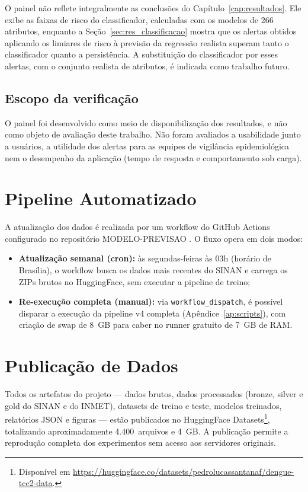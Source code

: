 O painel não reflete integralmente as conclusões do Capítulo~\ref{cap:resultados}. Ele exibe as faixas de risco do classificador, calculadas com os modelos de 266 atributos, enquanto a Seção~\ref{sec:res_classificacao} mostra que os alertas obtidos aplicando os limiares de risco à previsão da regressão realista superam tanto o classificador quanto a persistência. A substituição do classificador por esses alertas, com o conjunto realista de atributos, é indicada como trabalho futuro.

\subsection{Escopo da verificação}

O painel foi desenvolvido como meio de disponibilização dos resultados, e não como objeto de avaliação deste trabalho. Não foram avaliados a usabilidade junto a usuários, a utilidade dos alertas para as equipes de vigilância epidemiológica nem o desempenho da aplicação (tempo de resposta e comportamento sob carga).

\section{Pipeline Automatizado}

A atualização dos dados é realizada por um workflow do GitHub Actions configurado no repositório MODELO-PREVISAO \cite{modeloprevisao2026}. O fluxo opera em dois modos:

\begin{itemize}
    \item \textbf{Atualização semanal (cron):} às segundas-feiras às 03h (horário de Brasília), o workflow busca os dados mais recentes do SINAN e carrega os ZIPs brutos no HuggingFace, sem executar a pipeline de treino;
    \item \textbf{Re-execução completa (manual):} via \texttt{workflow\_dispatch}, é possível disparar a execução da pipeline v4 completa (Apêndice~\ref{ap:scripts}), com criação de swap de 8~GB para caber no runner gratuito de 7~GB de RAM.
\end{itemize}

\section{Publicação de Dados}

Todos os artefatos do projeto --- dados brutos, dados processados (bronze, silver e gold do SINAN e do INMET), datasets de treino e teste, modelos treinados, relatórios JSON e figuras --- estão publicados no HuggingFace Datasets\footnote{Disponível em \url{https://huggingface.co/datasets/pedrolucassantanaf/dengue-tcc2-data}.}, totalizando aproximadamente 4.400~arquivos e 4~GB. A publicação permite a reprodução completa dos experimentos sem acesso aos servidores originais.

